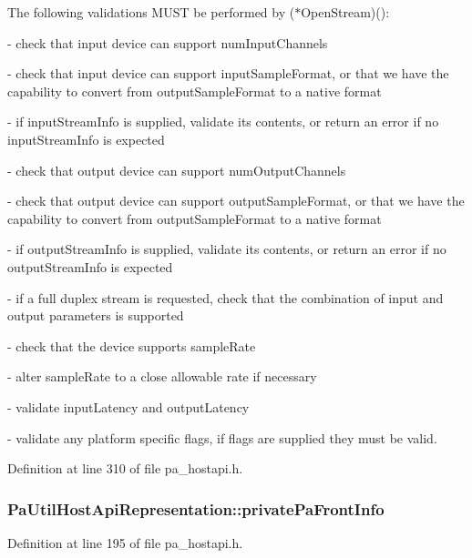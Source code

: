 The following validations M\+U\+ST be performed by ($\ast$\+Open\+Stream)()\+: \begin{DoxyVerb}- check that input device can support numInputChannels

- check that input device can support inputSampleFormat, or that
    we have the capability to convert from outputSampleFormat to
    a native format

- if inputStreamInfo is supplied, validate its contents,
    or return an error if no inputStreamInfo is expected

- check that output device can support numOutputChannels

- check that output device can support outputSampleFormat, or that
    we have the capability to convert from outputSampleFormat to
    a native format

- if outputStreamInfo is supplied, validate its contents,
    or return an error if no outputStreamInfo is expected

- if a full duplex stream is requested, check that the combination
    of input and output parameters is supported

- check that the device supports sampleRate

- alter sampleRate to a close allowable rate if necessary

- validate inputLatency and outputLatency

- validate any platform specific flags, if flags are supplied they
    must be valid.\end{DoxyVerb}
 

Definition at line 310 of file pa\+\_\+hostapi.\+h.

\subsubsection[{\texorpdfstring{private\+Pa\+Front\+Info}{privatePaFrontInfo}}]{ Pa\+Util\+Host\+Api\+Representation\+::private\+Pa\+Front\+Info}\hypertarget{struct_pa_util_host_api_representation_a5bef19eb1f47b8b5153d5f2fb76699eb}{}\label{struct_pa_util_host_api_representation_a5bef19eb1f47b8b5153d5f2fb76699eb}


Definition at line 195 of file pa\+\_\+hostapi.\+h.

